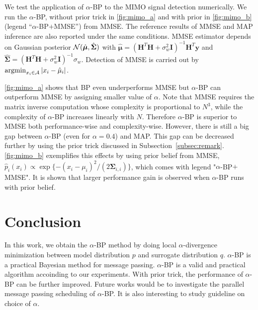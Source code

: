 \documentclass[conference,onecolumn]{IEEEtran}
\begin{document}
We test the application of $\alpha$-BP to the MIMO signal detection numerically. We run the $\alpha$-BP, without prior trick in \autoref{fig:mimo_a} and with prior in \autoref{fig:mimo_b} (legend ``$\alpha$-BP$+$MMSE'') from MMSE. The reference results of MMSE and MAP inference are also reported under the same conditions. MMSE estimator depends on Gaussian posterior $\mathcal{N}(\hat{\bm{\mu}}, \hat{\bm{\Sigma}})$ with $\hat{\bm{\mu}} = (\bm{H}^{T}\bm{H} + \sigma_w^2 \bm{I})^{-1}\bm{H}^{T}\bm{y}$ and $\hat{\bm{\Sigma}} = (\bm{H}^{T}\bm{H} + \sigma_w^2 \bm{I})^{-1}\sigma_w$. Detection of MMSE is carried out by $\operatorname{argmin}_{x_i\in \mathcal{A}}| x_i-\hat{\mu}_i |$.%

\autoref{fig:mimo_a} shows that BP even underperforms MMSE but $\alpha$-BP can outperform MMSE by assigning smaller value of $\alpha$.
Note that MMSE requires the matrix inverse computation whose complexity is proportional to $N^3$, while the complexity of $\alpha$-BP increases linearly with $N$. Therefore $\alpha$-BP is superior to MMSE both performance-wise and complexity-wise.  
However, there is still a big gap between $\alpha$-BP (even for $\alpha=0.4$) and MAP. This gap can be decreased further by using the prior trick discussed in Subsection~\ref{subsec:remark}. \autoref{fig:mimo_b} exemplifies this effects by using prior belief from MMSE, $\hat{p}_i(x_i)\propto \exp\{-(x_i-\mu_i)^2/(2\bm{\Sigma}_{i,i})\}$, which comes with legend "$\alpha$-BP$+$MMSE". It is shown that larger performance gain is observed when $\alpha$-BP runs with prior belief.

\section{Conclusion}
In this work, we obtain the $\alpha$-BP method by doing local $\alpha$-divergence minimization between model distribution $p$ and surrogate distribution $q$. $\alpha$-BP is a practical Bayesian method for message passing. $\alpha$-BP is a valid and practical algorithm accoinding to our experiments. With prior trick, the performance of $\alpha$-BP can be further improved. Future works would be to investigate the parallel message passing scheduling of $\alpha$-BP. It is also interesting to study guideline on choice of $\alpha$.



% 



% 
\end{document}
